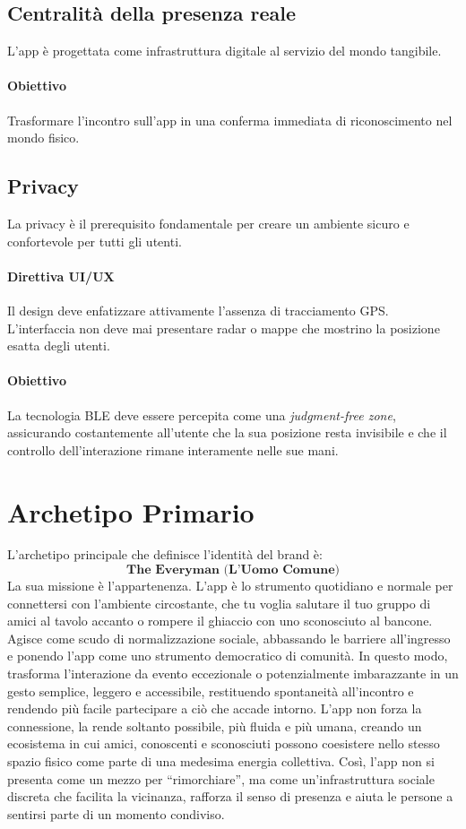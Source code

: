 \documentclass[a4paper, 11pt, table, dvipsnames]{article}
\begin{document}
\subsection{Centralità della presenza reale}
L'app è progettata come infrastruttura digitale al servizio
del mondo tangibile.

\paragraph{Obiettivo}
Trasformare l'incontro sull'app in una conferma immediata
di riconoscimento nel mondo fisico.

\subsection{Privacy}
La privacy è il prerequisito fondamentale per creare un
ambiente sicuro e confortevole per tutti gli utenti.
\paragraph{Direttiva UI/UX}
Il design deve enfatizzare attivamente l'assenza di
tracciamento GPS. L'interfaccia non deve mai presentare radar
o mappe che mostrino la posizione esatta degli utenti.
\paragraph{Obiettivo}
La tecnologia BLE deve essere percepita come una \textit{judgment-free zone},
assicurando costantemente all'utente che la sua posizione resta
invisibile e che il controllo dell'interazione rimane interamente
nelle sue mani.

\section{Archetipo Primario}
L'archetipo principale che definisce l'identità del brand è:
\[
      \textbf{The Everyman (L'Uomo Comune)}
\]
La sua missione è l'appartenenza. L'app è lo strumento quotidiano
e normale per connettersi con l'ambiente circostante, che
tu voglia salutare il tuo gruppo di amici al tavolo
accanto o rompere il ghiaccio con uno sconosciuto al
bancone. Agisce come scudo di normalizzazione sociale,
abbassando le barriere all'ingresso e ponendo l'app come
uno strumento democratico di comunità. In questo modo,
trasforma l'interazione da evento eccezionale o
potenzialmente imbarazzante in un gesto semplice, leggero e
accessibile, restituendo spontaneità all'incontro e
rendendo più facile partecipare a ciò che accade intorno. L'app
non forza la connessione, la rende soltanto possibile, più
fluida e più umana, creando un ecosistema in cui amici, conoscenti
e sconosciuti possono coesistere nello stesso spazio fisico
come parte di una medesima energia collettiva. Così, l'app
non si presenta come un mezzo per ``rimorchiare'', ma come
un'infrastruttura sociale discreta che facilita la
vicinanza, rafforza il senso di presenza e aiuta le persone
a sentirsi parte di un momento condiviso.
\end{document}
